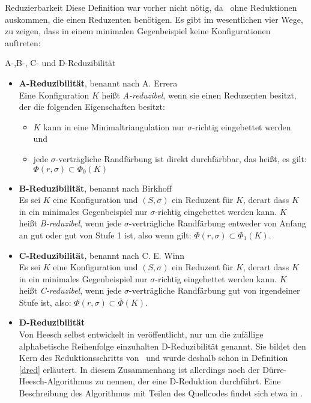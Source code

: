 \begin{section}{Reduzierbarkeit}
 Diese Definition war vorher nicht nötig, da \rsst\-\ ohne Reduktionen auskommen, die einen Reduzenten benötigen. Es gibt im wesentlichen vier Wege, zu zeigen, dass in einem minimalen Gegenbeispiel keine Konfigurationen auftreten:
 
 \begin{definition}{A-,B-, C- und D-Reduzibilität}
 \-\ 
  \begin{itemize}
   \item \textbf{A-Reduzibilität}, benannt nach A. Errera\\
   Eine Konfiguration $K$ heißt \textit{A-reduzibel}, wenn sie einen Reduzenten besitzt, der die folgenden Eigenschaften besitzt:
   \begin{itemize}
    \item $K$ kann in eine Minimaltriangulation nur $\sigma$-richtig eingebettet werden und
    \item jede $\sigma$-verträgliche Randfärbung ist direkt durchfärbbar, das heißt, es gilt: $\Phi(r,\sigma) \subset \Phi_0(K)$
   \end{itemize}
   \item \textbf{B-Reduzibilität}, benannt nach Birkhoff\\
   Es sei $K$ eine Konfiguration und $(S,\sigma)$ ein Reduzent für $K$, derart dass $K$ in ein minimales Gegenbeispiel nur $\sigma$-richtig eingebettet werden kann. $K$ heißt \textit{B-reduzibel}, wenn jede $\sigma$-verträgliche Randfärbung entweder von Anfang an gut oder gut von Stufe 1 ist, also wenn gilt: $\Phi(r,\sigma)\subset\Phi_1(K)$.
   \item \textbf{C-Reduzibilität}, benannt nach C. E. Winn\\
   Es sei $K$ eine Konfiguration und $(S,\sigma)$ ein Reduzent für $K$, derart dass $K$ in ein minimales Gegenbeispiel nur $\sigma$-richtig eingebettet werden kann. $K$ heißt \textit{C-reduzibel}, wenn jede $\sigma$-verträgliche Randfärbung gut von irgendeiner Stufe ist, also: $\Phi(r,\sigma) \subset \overline{\Phi}(K)$.
   \item \textbf{D-Reduzibilität}\\
   Von Heesch selbst entwickelt in \cite{heesch} veröffentlicht, nur um die zufällige alphabetische Reihenfolge einzuhalten D-Reduzibilität genannt. Sie bildet den Kern  des Reduktionsschritts von \rsst\-\ und wurde deshalb schon in Definition \ref{dred} erläutert. In diesem Zusammenhang ist allerdings noch der Dürre-Heesch-Algorithmus zu nennen, der eine D-Reduktion durchführt. Eine Beschreibung des Algorithmus mit Teilen des Quellcodes findet sich etwa in \cite[Kapitel 6.4]{fritsch}.
  \end{itemize}
 \end{definition}

\end{section}
